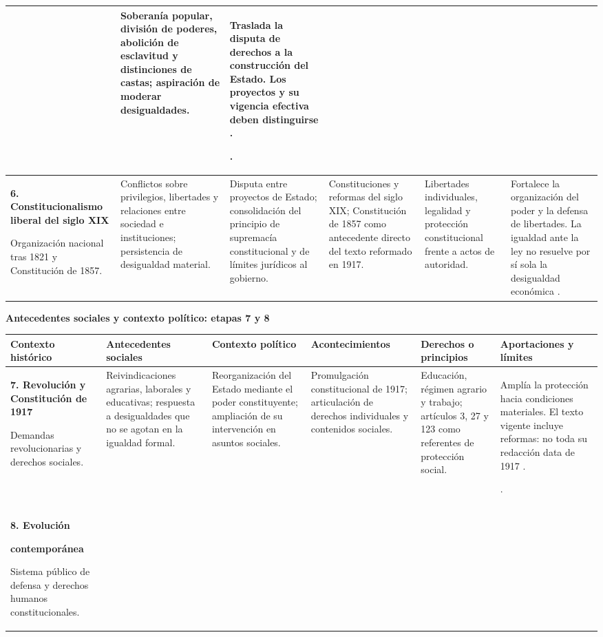 \documentclass[12pt,spanish,letterpaper,oneside]{article}
\newcommand{\encabezado}{\rowcolor{cabecera}\textbf{Contexto hist\'orico}&\textbf{Antecedentes sociales}&\textbf{Contexto pol\'itico}&\textbf{Acontecimientos}&\textbf{Derechos o principios}&\textbf{Aportaciones y l\'imites}\\\hline}
\begin{document}
\begin{landscape}
\begin{tabularx}{\linewidth}{|Y|Y|Y|Y|Y|Y|}
& Soberan\'ia popular, divisi\'on de poderes, abolici\'on de esclavitud y distinciones de castas; aspiraci\'on de moderar desigualdades.
& Traslada la disputa de derechos a la construcci\'on del Estado. Los proyectos y su vigencia efectiva deben distinguirse \citep[nums.~5, 12 y 15]{morelos1813}.\par\citep[p.~7]{arteaga}.\\\hline
\textbf{6. Constitucionalismo liberal del siglo XIX}\par Organizaci\'on nacional tras 1821 y Constituci\'on de 1857.
& Conflictos sobre privilegios, libertades y relaciones entre sociedad e instituciones; persistencia de desigualdad material.
& Disputa entre proyectos de Estado; consolidaci\'on del principio de supremac\'ia constitucional y de l\'imites jur\'idicos al gobierno.
& Constituciones y reformas del siglo XIX; Constituci\'on de 1857 como antecedente directo del texto reformado en 1917.
& Libertades individuales, legalidad y protecci\'on constitucional frente a actos de autoridad.
& Fortalece la organizaci\'on del poder y la defensa de libertades. La igualdad ante la ley no resuelve por s\'i sola la desigualdad econ\'omica \citep[pp.~1--2, 7]{arteaga}.\\\hline
\end{tabularx}
\clearpage
\noindent\textbf{Antecedentes sociales y contexto pol\'itico: etapas 7 y 8}\par\medskip
\begin{tabularx}{\linewidth}{|Y|Y|Y|Y|Y|Y|}
\hline\encabezado
\textbf{7. Revoluci\'on y Constituci\'on de 1917}\par Demandas revolucionarias y derechos sociales.
& Reivindicaciones agrarias, laborales y educativas; respuesta a desigualdades que no se agotan en la igualdad formal.
& Reorganizaci\'on del Estado mediante el poder constituyente; ampliaci\'on de su intervenci\'on en asuntos sociales.
& Promulgaci\'on constitucional de 1917; articulaci\'on de derechos individuales y contenidos sociales.
& Educaci\'on, r\'egimen agrario y trabajo; art\'iculos 3, 27 y 123 como referentes de protecci\'on social.
& Ampl\'ia la protecci\'on hacia condiciones materiales. El texto vigente incluye reformas: no toda su redacci\'on data de 1917 \citep[p.~2]{arteaga}.\par\citep[arts.~3, 27 y 123]{cpeum2026}.\\\hline
\textbf{8. Evoluci\'on}\par\textbf{contempor\'anea}\par Sistema p\'ublico de defensa y derechos humanos constitucionales.

\end{tabularx}
\end{landscape}
\end{document}
